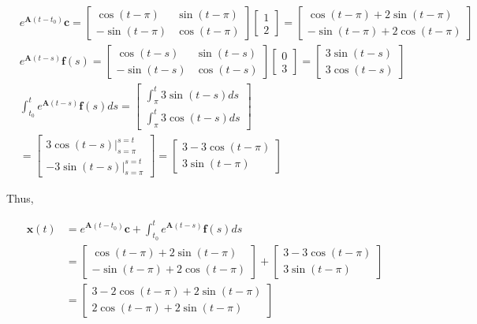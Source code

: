 \documentclass[10pt]{article}
\begin{document}
$$
\begin{aligned}
& e^{\mathbf{A}\left(t-t_{0}\right)} \mathbf{c}=\left[\begin{array}{cc}
\cos (t-\pi) & \sin (t-\pi) \\
-\sin (t-\pi) & \cos (t-\pi)
\end{array}\right]\left[\begin{array}{l}
1 \\
2
\end{array}\right]=\left[\begin{array}{c}
\cos (t-\pi)+2 \sin (t-\pi) \\
-\sin (t-\pi)+2 \cos (t-\pi)
\end{array}\right] \\
& e^{\mathbf{A}(t-s)} \mathbf{f}(s)=\left[\begin{array}{cc}
\cos (t-s) & \sin (t-s) \\
-\sin (t-s) & \cos (t-s)
\end{array}\right]\left[\begin{array}{l}
0 \\
3
\end{array}\right]=\left[\begin{array}{c}
3 \sin (t-s) \\
3 \cos (t-s)
\end{array}\right] \\
& \int_{t_{0}}^{t} e^{\mathbf{A}(t-s)} \mathbf{f}(s) d s=\left[\begin{array}{l}
\int_{\pi}^{t} 3 \sin (t-s) d s \\
\int_{\pi}^{t} 3 \cos (t-s) d s
\end{array}\right] \\
& =\left[\begin{array}{c}
\left.3 \cos (t-s)\right|_{s=\pi} ^{s=t} \\
-\left.3 \sin (t-s)\right|_{s=\pi} ^{s=t}
\end{array}\right]=\left[\begin{array}{c}
3-3 \cos (t-\pi) \\
3 \sin (t-\pi)
\end{array}\right]
\end{aligned}
$$

Thus,

$$
\begin{aligned}
\mathbf{x}(t) & =e^{\mathbf{A}\left(t-t_{0}\right)} \mathbf{c}+\int_{t_{0}}^{t} e^{\mathbf{A}(t-s)} \mathbf{f}(s) d s \\
& =\left[\begin{array}{c}
\cos (t-\pi)+2 \sin (t-\pi) \\
-\sin (t-\pi)+2 \cos (t-\pi)
\end{array}\right]+\left[\begin{array}{c}
3-3 \cos (t-\pi) \\
3 \sin (t-\pi)
\end{array}\right] \\
& =\left[\begin{array}{c}
3-2 \cos (t-\pi)+2 \sin (t-\pi) \\
2 \cos (t-\pi)+2 \sin (t-\pi)
\end{array}\right]
\end{aligned}
$$
\end{document}
